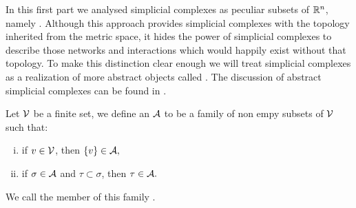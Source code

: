 \documentclass[../1.tex]{subfiles}
\begin{document}




    \newpage
    In this first part we analysed simplicial complexes as peculiar subsets of $\mathbb{R}^n$, namely .
    Although this approach provides simplicial complexes with the topology inherited from the metric space, it hides the power of simplicial complexes 
    to describe those networks and interactions which would happily exist without that topology. To make this distinction clear enough we will treat
    simplicial complexes as a realization of more abstract objects called . The discussion of abstract simplicial complexes
    can be found in \cite{rotman,comptop}.
    
    \begin{defn}
        Let $\mathcal{V}$ be a finite set, we define an  $\mathcal{A}$ to be 
        a family of non empy subsets of $\mathcal{V}$ such that:
        \begin{enumerate}[(i)]
            \item if $v \in \mathcal{V}$, then $\{v\} \in \mathcal{A},$
            \item if $\sigma \in \mathcal{A}$ and $\tau \subset \sigma$, then $\tau \in \mathcal{A}.$
        \end{enumerate}
        We call the member of this family .
    \end{defn}
    
\end{document}
